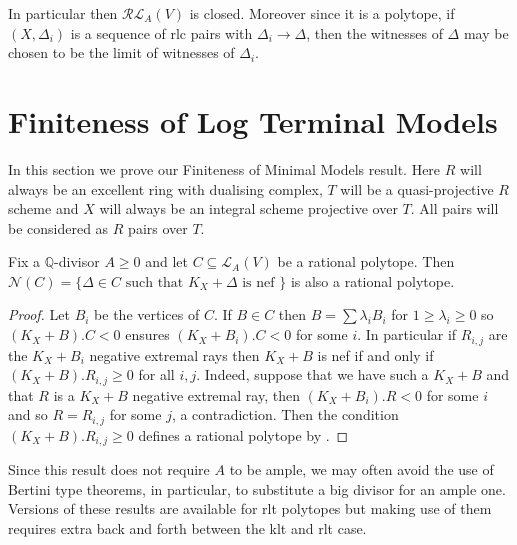 \documentclass[a4paper,12pt]{amsart}
\newcommand\myworries[1]{\textcolor{red}{#1}}
\begin{document}
	In particular then $\mathcal{RL}_{A}(V)$ is closed. Moreover since it is a polytope, if $(X,\Delta_{i})$ is a sequence of rlc pairs with $\Delta_{i} \to \Delta$, then the witnesses of $\Delta$ may be chosen to be the limit of witnesses of $\Delta_{i}$. 
	
	\section{Finiteness of Log Terminal Models}
	
	
	In this section we prove our Finiteness of Minimal Models result. Here $R$ will always be an excellent ring with dualising complex, $T$ will be a quasi-projective $R$ scheme and $X$ will always be an integral scheme projective over $T$. All pairs will be considered as $R$ pairs over $T$.
	
	\begin{lemma}\label{neftope}
		Fix a $\mathbb{Q}$-divisor $A \geq 0$ and let $C\subseteq \mathcal{L}_{A}(V)$ be a rational polytope. Then $\mathcal{N}(C)=\{\Delta \in C \text{ such that } K_{X}+\Delta \text{ is nef } \}$ is also a rational polytope.
	\end{lemma}

	\begin{proof}	
		Let $B_{i}$ be the vertices of $C$. If $B \in C$ then $B= \sum \lambda_{i} B_{i}$ for $1 \geq \lambda_{i} \geq 0$ so $(K_{X}+B).C <0$ ensures $(K_{X}+B_{i}).C <0$ for some $i$. In particular if $R_{i,j}$ are the $K_{X}+B_{i}$ negative extremal rays then $K_{X}+B$ is nef if and only if $(K_{X}+B).R_{i,j} \geq 0$ for all $i,j$. Indeed, suppose that we have such a $K_{X}+B$ and that $R$ is a $K_{X}+B$ negative extremal ray, then $(K_{X}+B_{i}).R <0$ for some $i$ and so $R=R_{i,j}$ for some $j$, a contradiction. Then the condition $(K_{X}+B).R_{i,j} \geq 0$ defines a rational polytope by \cite[Proposition 9.31]{bhatt2020globally+}.
	\end{proof}
	
	Since this result does not require $A$ to be ample, we may often avoid the use of Bertini type theorems, \cite[Lemma 3.7.3]{birkar2010existence} in particular, to substitute a big divisor for an ample one. Versions of these results are available for rlt polytopes but making use of them requires extra back and forth between the klt and rlt case. 
	
\end{document}
